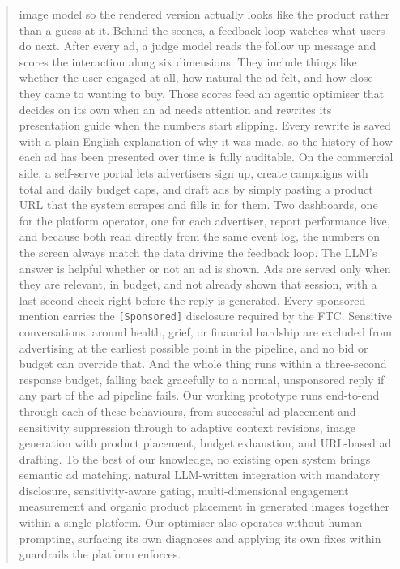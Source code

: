 \begin{abstract}
image model so the rendered version actually looks like the product rather
than a guess at it.
\newline \newline
Behind the scenes, a feedback loop watches what users do next. After every
ad, a judge model reads the follow up message and scores the interaction
along six dimensions. They include things like whether the user engaged at all, how
natural the ad felt, and how close they came to wanting to buy. Those scores 
feed an agentic optimiser that decides on its own when an ad needs attention and 
rewrites its presentation guide when the numbers start slipping. Every 
rewrite is saved with a plain English
explanation of why it was made, so the history of how each ad has been
presented over time is fully auditable. On the commercial side, a
self-serve portal lets advertisers sign up, create campaigns with total and
daily budget caps, and draft ads by simply pasting a product URL that the
system scrapes and fills in for them. Two dashboards, one for the platform
operator, one for each advertiser, report performance live, and because
both read directly from the same event log, the numbers on the screen
always match the data driving the feedback loop.
\newline \newline
The LLM's answer is helpful whether or not
an ad is shown. Ads are served only when they are relevant, in budget, and
not already shown that session, with a last-second check right before the
reply is generated. Every sponsored mention carries the
\texttt{[Sponsored]} disclosure required by the FTC.
Sensitive conversations, around health, grief, or financial hardship are
excluded from advertising at the earliest possible point in the pipeline,
and no bid or budget can override that. And the whole thing runs within a
three-second response budget, falling back gracefully to a normal,
unsponsored reply if any part of the ad pipeline fails. Our working prototype
runs end-to-end through each of these behaviours,
from successful ad placement and sensitivity suppression through to adaptive
context revisions, image generation with product placement, budget
exhaustion, and URL-based ad drafting. To the best of our knowledge, no
existing open system brings semantic ad matching, natural LLM-written
integration with mandatory disclosure, sensitivity-aware gating,
multi-dimensional engagement measurement and organic product placement in generated images
together within a single platform. Our optimiser also operates 
without human prompting, surfacing its own diagnoses and applying its own fixes 
within guardrails the platform enforces.

\end{abstract}